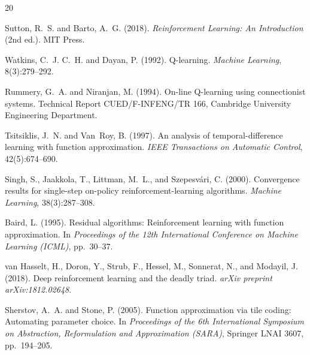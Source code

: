 \documentclass[11pt]{article}
\begin{document}

\begin{thebibliography}{20}


Sutton, R.~S. and Barto, A.~G. (2018).
\newblock \emph{Reinforcement Learning: An Introduction} (2nd ed.).
\newblock MIT Press.

Watkins, C.~J. C.~H. and Dayan, P. (1992).
\newblock Q-learning.
\newblock \emph{Machine Learning}, 8(3):279--292.

Rummery, G.~A. and Niranjan, M. (1994).
\newblock On-line Q-learning using connectionist systems.
\newblock Technical Report CUED/F-INFENG/TR 166, Cambridge University Engineering Department.


Tsitsiklis, J.~N. and Van~Roy, B. (1997).
\newblock An analysis of temporal-difference learning with function approximation.
\newblock \emph{IEEE Transactions on Automatic Control}, 42(5):674--690.

Singh, S., Jaakkola, T., Littman, M.~L., and Szepesv\'{a}ri, C. (2000).
\newblock Convergence results for single-step on-policy reinforcement-learning algorithms.
\newblock \emph{Machine Learning}, 38(3):287--308.

Baird, L. (1995).
\newblock Residual algorithms: Reinforcement learning with function approximation.
\newblock In \emph{Proceedings of the 12th International Conference on Machine Learning (ICML)}, pp.\ 30--37.

van Hasselt, H., Doron, Y., Strub, F., Hessel, M., Sonnerat, N., and Modayil, J. (2018).
\newblock Deep reinforcement learning and the deadly triad.
\newblock \emph{arXiv preprint arXiv:1812.02648}.


Sherstov, A.~A. and Stone, P. (2005).
\newblock Function approximation via tile coding: Automating parameter choice.
\newblock In \emph{Proceedings of the 6th International Symposium on Abstraction, Reformulation and Approximation (SARA)}, Springer LNAI 3607, pp.\ 194--205.


\end{thebibliography}
\end{document}
